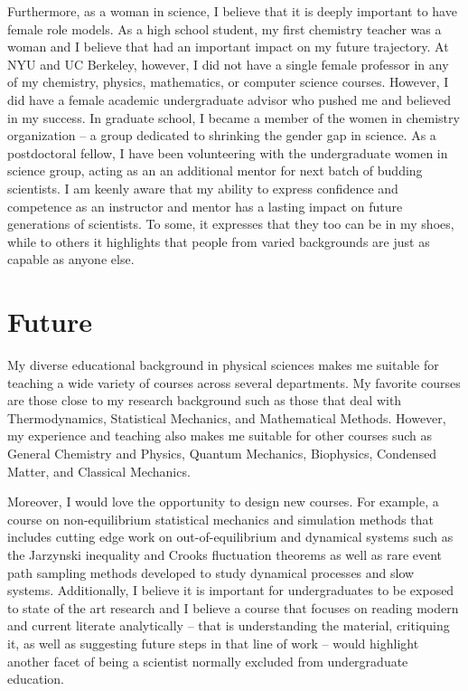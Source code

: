 \documentclass[11pt]{article}
\begin{document}
Furthermore, as a woman in science, I believe that it is deeply important to have female role models.  As a high school student, my first chemistry teacher was a woman and I believe that had an important impact on my future trajectory.  At NYU and UC Berkeley, however, I did not have a single female professor in any of my chemistry, physics, mathematics, or computer science courses.  However, I did have a female academic undergraduate advisor who pushed me and believed in my success.  In graduate school, I became a member of the women in chemistry organization -- a group dedicated to shrinking the gender gap in science.  As a postdoctoral fellow, I have been volunteering with the undergraduate women in science group, acting as an an additional mentor for next batch of budding scientists.  I am keenly aware that my ability to express confidence and competence as an instructor and mentor has a lasting impact on future generations of scientists.  To some, it expresses that they too can be in my shoes, while to others it highlights that people from varied backgrounds are just as capable as anyone else.

\section{Future} %

My diverse educational background in physical sciences makes me suitable for teaching a wide variety of courses across several departments.  My favorite courses are those close to my research background such as those that deal with Thermodynamics, Statistical Mechanics, and Mathematical Methods.  However, my experience and teaching also makes me suitable for other courses such as General Chemistry and Physics, Quantum Mechanics, Biophysics, Condensed Matter, and Classical Mechanics.

Moreover, I would love the opportunity to design new courses.  For example, a course on non-equilibrium statistical mechanics and simulation methods that includes cutting edge work on out-of-equilibrium and dynamical systems such as the Jarzynski inequality and Crooks fluctuation theorems as well as rare event path sampling methods developed to study dynamical processes and slow systems.  Additionally, I believe it is important for undergraduates to be exposed to state of the art research and I believe a course that focuses on reading modern and current literate analytically -- that is understanding the material, critiquing it, as well as suggesting future steps in that line of work -- would highlight another facet of being a scientist normally excluded from undergraduate education.
\end{document}

